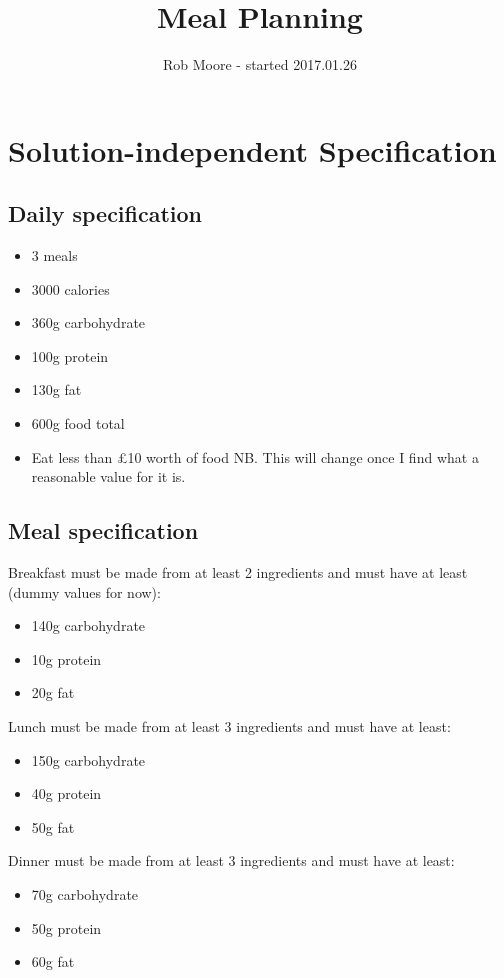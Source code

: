 \documentclass[a4paper]{article}
\title{Meal Planning}
\author{Rob Moore - started 2017.01.26}
\begin{document}
\maketitle

\section{Solution-independent Specification}

\subsection{Daily specification}

\begin{itemize}
  \item 3 meals
  \item 3000 calories
  \item 360g carbohydrate
  \item 100g protein
  \item 130g fat
  \item 600g food total
  \item Eat less than £10 worth of food NB. This will change once I find what a reasonable value for it is.
\end{itemize}

\subsection{Meal specification}

Breakfast must be made from at least 2 ingredients and must have at least (dummy values for now):
\begin{itemize}
  \item 140g carbohydrate
  \item 10g protein
  \item 20g fat
\end{itemize}

Lunch must be made from at least 3 ingredients and must have at least:
\begin{itemize}
  \item 150g carbohydrate
  \item 40g protein
  \item 50g fat
\end{itemize}

Dinner must be made from at least 3 ingredients and must have at least:
\begin{itemize}
  \item 70g carbohydrate
  \item 50g protein
  \item 60g fat
\end{itemize}
\end{document}
